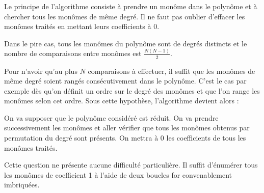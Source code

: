 

Le principe de l'algorithme consiste à prendre un monôme dans le polynôme et à chercher tous les monômes de même degré. Il ne faut pas oublier \og d'effacer \fg{} les monômes traités en mettant leurs coefficients à 0.



Dans le pire cas, tous les monômes du polynôme sont de degrés distincts et le nombre de comparaisons entre monômes est $\frac{N(N-1)}{2}$.

\Q
Pour n'avoir qu'au plus $N$ comparaisons à effectuer, il suffit que les monômes de même degré soient rangés consécutivement dans le polynôme. C'est le cas par exemple dès qu'on définit un ordre sur le degré des monômes et que l'on range les monômes selon cet ordre. Sous cette hypothèse, l'algorithme devient alors :



\Q
On va supposer que le polynôme considéré est réduit. On va prendre successivement les monômes et aller vérifier que tous les monômes obtenus par permutation du degré sont présents. On mettra à 0 les coefficients de tous les monômes traités.



\Q
Cette question ne présente aucune difficulté particulière. Il suffit d'énumérer tous les monômes de coefficient 1 à l'aide de deux boucles \og for \fg{} convenablement imbriquées.



\Fin
